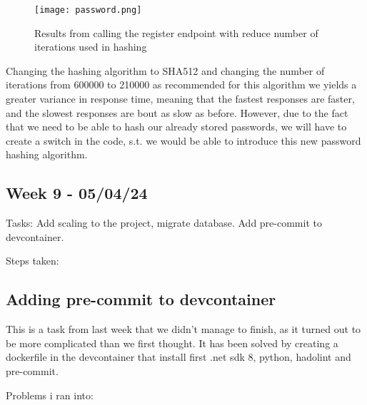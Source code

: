 \begin{figure}[H]
\centering
\texttt{[image: password.png]}
\caption{Results from calling the register endpoint with reduce number of iterations used in hashing}
\end{figure}

Changing the hashing algorithm to SHA512 and changing the number of iterations from 600000 to 210000 as recommended for this algorithm we yields a greater variance in response time, meaning that the fastest responses are faster, and the slowest responses are bout as slow as before. However, due to the fact that we need to be able to hash our already stored passwords, we will have to create a switch in the code, s.t. we would be able to introduce this new password hashing algorithm.

\subsection{Week 9 - 05/04/24}
\label{log:week9}

Tasks: Add scaling to the project, migrate database. Add pre-commit to
devcontainer.

Steps taken:

\subsection{Adding pre-commit to devcontainer}
\label{log:adding-pre-commit-to-devcontainer}

This is a task from last week that we didn't manage to finish, as it turned out to be more complicated than we first thought. It has been solved by creating a dockerfile in the devcontainer that install first .net sdk 8, python, hadolint and pre-commit.

Problems i ran into:

